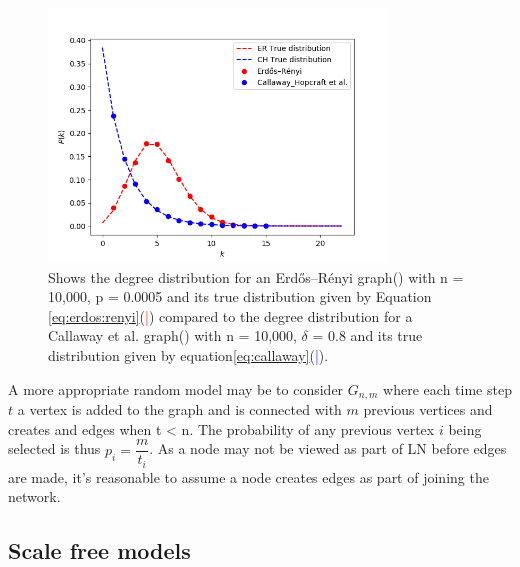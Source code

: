 \begin{figure}[!htb]
		\hspace*{-0.5cm} 
	\centering
	\includegraphics[width=9cm]{images/random_topology_degree_distribution.png}
	\caption{Shows the degree distribution for an Erdős–Rényi graph(\tikzcircle[red, fill=red]{2pt}) with n = 10,000, p = 0.0005 and its true distribution given by Equation \ref{eq:erdos:renyi}(\textcolor{red}{|}) compared to the degree distribution for a Callaway et al. graph(\tikzcircle[blue, fill=blue]{2pt})  with n = 10,000, $\delta$ = 0.8 and its true distribution given by equation\ref{eq:callaway}(\textcolor{blue}{|}).
	}
	\label{fig:callaway:erdos}
		\hspace*{2mm} 
\end{figure}

A more appropriate random model may be to consider $G_{n,m}$ where each time step $t$ a vertex is added to the graph and is connected with $m$ previous vertices and creates and edges when t < n. The probability of any previous vertex $i$ being selected is thus $p_i = \dfrac{m}{t_i}$. 
As a node may not be viewed as part of LN before edges are made, it's reasonable to assume a node creates edges as part of joining the network.




\subsection{Scale free models}

